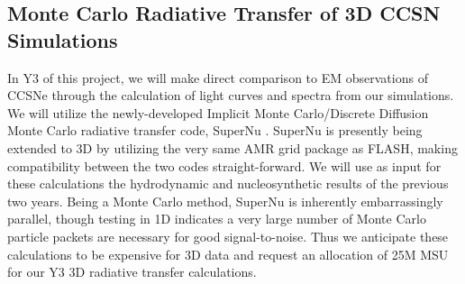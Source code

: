\subsection{Monte Carlo Radiative Transfer of 3D CCSN Simulations}
\label{sec:radtrans}

In Y3 of this project, we will make direct comparison to EM observations of CCSNe through the calculation of light curves and spectra from our simulations.
We will utilize the newly-developed Implicit Monte Carlo/Discrete Diffusion Monte Carlo radiative transfer code, SuperNu \citep{Wollaeger:2013ix}.
SuperNu is presently being extended to 3D by utilizing the very same AMR grid package as FLASH, making compatibility between the two codes straight-forward.
We will use as input for these calculations the hydrodynamic and nucleosynthetic results of the previous two years.
Being a Monte Carlo method, SuperNu is inherently embarrassingly parallel, though testing in 1D indicates a very large number of Monte Carlo particle packets are necessary for good signal-to-noise.
Thus we anticipate these calculations to be expensive for 3D data and request an allocation of 25M MSU for our Y3 3D radiative transfer calculations. 